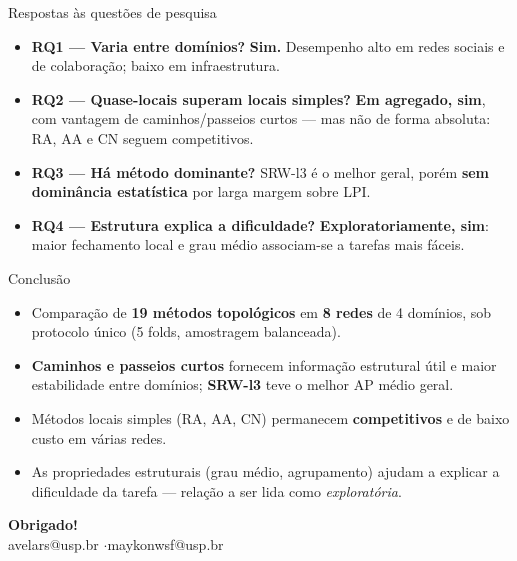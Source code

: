 \documentclass[aspectratio=169,11pt]{beamer}
\providecommand{\EspacoAposTitulo}{\vspace*{0.93cm}}
\providecommand{\EspacoEntreTopicos}{0.29cm}
\newcommand{\dest}[1]{\textcolor{modTeal}{\textbf{#1}}}
\begin{document}
\begin{frame}[t]{Respostas às questões de pesquisa}

  \EspacoAposTitulo

  \begin{itemize}
    \setlength{\itemsep}{\EspacoEntreTopicos}

    \item \textbf{RQ1 — Varia entre domínios?} \dest{Sim.} Desempenho
    alto em redes sociais e de colaboração; baixo em infraestrutura.

    \item \textbf{RQ2 — Quase-locais superam locais simples?}
    \dest{Em agregado, sim}, com vantagem de caminhos/passeios curtos —
    mas não de forma absoluta: RA, AA e CN seguem competitivos.

    \item \textbf{RQ3 — Há método dominante?} SRW-l3 é o melhor geral,
    porém \dest{sem dominância estatística} por larga margem sobre LPI.

    \item \textbf{RQ4 — Estrutura explica a dificuldade?}
    \dest{Exploratoriamente, sim}: maior fechamento local e grau médio
    associam-se a tarefas mais fáceis.
  \end{itemize}

\end{frame}

\begin{frame}[t]{Conclusão}

  \EspacoAposTitulo

  \begin{itemize}
    \setlength{\itemsep}{\EspacoEntreTopicos}

    \item Comparação de \dest{19 métodos topológicos} em \dest{8 redes}
    de 4 domínios, sob protocolo único (5 folds, amostragem balanceada).

    \item \dest{Caminhos e passeios curtos} fornecem informação estrutural
    útil e maior estabilidade entre domínios; \dest{SRW-l3} teve o melhor
    AP médio geral.

    \item Métodos locais simples (RA, AA, CN) permanecem
    \dest{competitivos} e de baixo custo em várias redes.

    \item As propriedades estruturais (grau médio, agrupamento) ajudam a
    explicar a dificuldade da tarefa — relação a ser lida como
    \textit{exploratória}.
  \end{itemize}

  \vspace{0.30cm}
  \begin{center}
    {\color{modNavy}\large\textbf{Obrigado!}}\\[0.12cm]
    {\footnotesize avelars@usp.br \quad$\cdot$\quad maykonwsf@usp.br}
  \end{center}

\end{frame}
\end{document}
